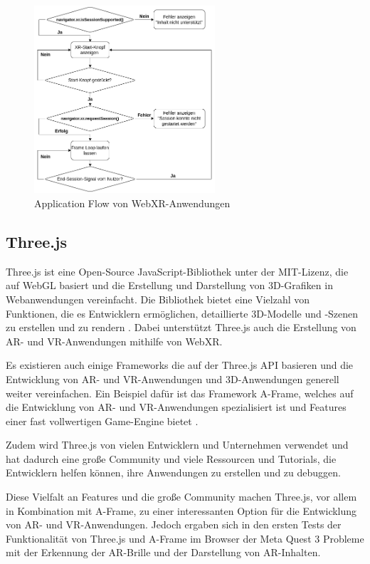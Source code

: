 \begin{figure}[H]
    \centering
    \includegraphics[width=0.6\textwidth]{images/WebXR-App-Flow.png}
    \caption{Application Flow von WebXR-Anwendungen}
    \label{fig:webxr-app-flow}
\end{figure}

\subsection{Three.js}

Three.js ist eine Open-Source JavaScript-Bibliothek unter der MIT-Lizenz, die auf WebGL basiert und die Erstellung und Darstellung von 3D-Grafiken in Webanwendungen vereinfacht.
Die Bibliothek bietet eine Vielzahl von Funktionen, die es Entwicklern ermöglichen, detaillierte 3D-Modelle und -Szenen zu erstellen und zu rendern \autocite[][]{threejs-docs}.
Dabei unterstützt Three.js auch die Erstellung von AR- und VR-Anwendungen mithilfe von WebXR.

Es existieren auch einige Frameworks die auf der Three.js API basieren und die Entwicklung von AR- und VR-Anwendungen und 3D-Anwendungen generell weiter vereinfachen.
Ein Beispiel dafür ist das Framework A-Frame, welches auf die Entwicklung von AR- und VR-Anwendungen spezialisiert ist und Features einer fast vollwertigen Game-Engine bietet \autocite[]{a-frame-introduction}.

Zudem wird Three.js von vielen Entwicklern und Unternehmen verwendet und hat dadurch eine große Community und viele Ressourcen und Tutorials, die Entwicklern helfen können, ihre Anwendungen zu erstellen und zu debuggen.

Diese Vielfalt an Features und die große Community machen Three.js, vor allem in Kombination mit A-Frame, zu einer interessanten Option für die Entwicklung von AR- und VR-Anwendungen.
Jedoch ergaben sich in den ersten Tests der Funktionalität von Three.js und A-Frame im Browser der Meta Quest 3 Probleme mit der Erkennung der AR-Brille und der Darstellung von AR-Inhalten.


